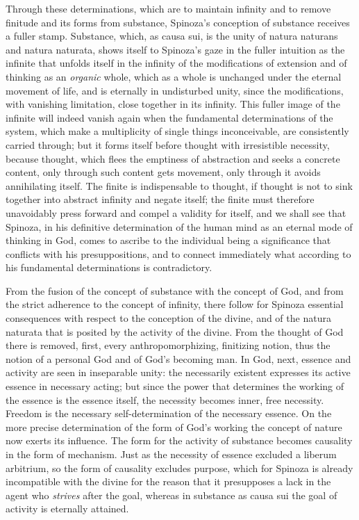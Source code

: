 Through these determinations, which are to maintain infinity and to
remove finitude and its forms from substance, Spinoza's conception of
substance receives a fuller stamp. Substance, which, as causa sui, is
the unity of natura naturans and natura naturata, shows itself to
Spinoza's gaze in the fuller intuition as the infinite that unfolds
itself in the infinity of the modifications of extension and of thinking
as an \emph{organic} whole, which as a whole is unchanged under the
eternal movement of life, and is eternally in undisturbed unity, since
the modifications, with vanishing limitation, close together in its
infinity. This fuller image of the infinite will indeed vanish again
when the fundamental determinations of the system, which make a
multiplicity of single things inconceivable, are consistently carried
through; but it forms itself before thought with irresistible necessity,
because thought, which flees the emptiness of abstraction and seeks a
concrete content, only through such content gets movement, only through
it avoids annihilating itself. The finite is indispensable to thought,
if thought is not to sink together into abstract infinity and negate
itself; the finite must therefore unavoidably press forward and compel a
validity for itself, and we shall see that Spinoza, in his
definitive determination of the human mind as an eternal mode of
thinking in God, comes to ascribe to the individual being a significance
that conflicts with his presuppositions, and to connect immediately what
according to his fundamental determinations is contradictory.

\divrule

From the fusion of the concept of substance with the concept of God,
and from the strict adherence to the concept of infinity, there follow
for Spinoza essential consequences with respect to the conception of
the divine, and of the natura naturata that is posited by the activity
of the divine. From the thought of God there is removed, first, every
anthropomorphizing, finitizing notion, thus the notion of a personal
God and of God's becoming man. In God, next, essence and activity are
seen in inseparable unity: the necessarily existent expresses its
active essence in necessary acting; but since the power that
determines the working of the essence is the essence itself, the
necessity becomes inner, free necessity. Freedom is the necessary
self-determination of the necessary essence. On the more precise
determination of the form of God's working the concept of nature now
exerts its influence. The form for the activity of substance becomes
causality in the form of mechanism. Just as the necessity of essence
excluded a liberum arbitrium, so the form of causality excludes
purpose, which for Spinoza is already incompatible with the divine for
the reason that it presupposes a lack in the agent who \emph{strives}
after the goal, whereas in substance as causa sui the goal of activity
is eternally attained.

